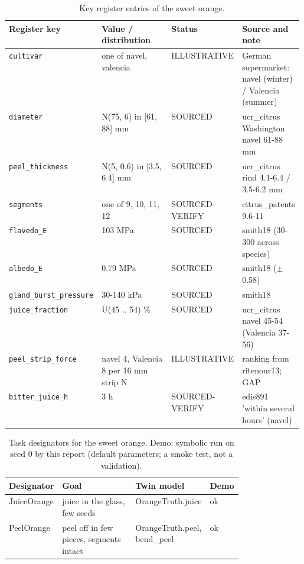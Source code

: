 \documentclass[10.5pt,a4paper]{article}
\begin{document}
\begin{table}[htbp]\centering\scriptsize\caption{Key register entries of the sweet orange.}
\begin{tabularx}{\linewidth}{@{}p{0.19\linewidth}p{0.27\linewidth}p{0.12\linewidth}X@{}}\toprule Register key & Value / distribution & Status & Source and note \\\midrule
\texttt{cultivar} & one of navel, valencia & ILLUSTRATIVE & German supermarket: navel (winter) / Valencia (summer) \\
\texttt{diameter} & N(75, 6) in [61, 88] mm & SOURCED & ucr\_citrus Washington navel 61-88 mm \\
\texttt{peel\_\allowbreak{}thickness} & N(5, 0.6) in [3.5, 6.4] mm & SOURCED & ucr\_citrus rind 4.1-6.4 / 3.5-6.2 mm \\
\texttt{segments} & one of 9, 10, 11, 12 & SOURCED-VERIFY & citrus\_patents 9.6-11 \\
\texttt{flavedo\_\allowbreak{}E} & 103 MPa & SOURCED & smith18 (30-300 across species) \\
\texttt{albedo\_\allowbreak{}E} & 0.79 MPa & SOURCED & smith18 ($\pm$0.58) \\
\texttt{gland\_\allowbreak{}burst\_\allowbreak{}pressure} & 30-140 kPa & SOURCED & smith18 \\
\texttt{juice\_\allowbreak{}fraction} & U(45 .. 54) \% & SOURCED & ucr\_citrus navel 45-54 (Valencia 37-56) \\
\texttt{peel\_\allowbreak{}strip\_\allowbreak{}force} & navel 4, Valencia 8 per 16 mm strip N & ILLUSTRATIVE & ranking from ritenour13; GAP \\
\texttt{bitter\_\allowbreak{}juice\_\allowbreak{}h} & 3 h & SOURCED-VERIFY & edis891 'within several hours' (navel) \\\bottomrule\end{tabularx}\end{table}
\begin{table}[htbp]\centering\scriptsize\caption{Task designators for the sweet orange. Demo: symbolic run on seed 0 by this report (default parameters; a smoke test, not a validation).}
\begin{tabularx}{\linewidth}{@{}p{0.16\linewidth}Xp{0.3\linewidth}l@{}}\toprule Designator & Goal & Twin model & Demo \\\midrule
JuiceOrange & juice in the glass, few seeds & OrangeTruth.juice & ok \\
PeelOrange & peel off in few pieces, segments intact & OrangeTruth.peel, bend\_peel & ok \\\bottomrule\end{tabularx}\end{table}
\end{document}
